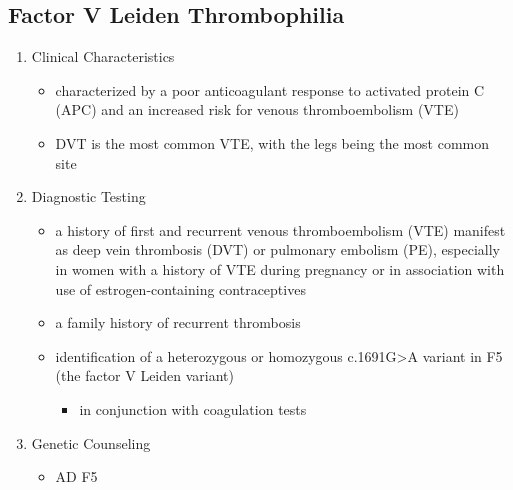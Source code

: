 \documentclass[12pt]{scrartcl}
\begin{document}
\subsection{Factor V Leiden Thrombophilia}
\label{sec:org8611655}
\begin{enumerate}
\item Clinical Characteristics
\label{sec:org2b34f58}
\begin{itemize}
\item characterized by a poor anticoagulant response to activated protein
C (APC) and an increased risk for venous thromboembolism (VTE)
\item DVT is the most common VTE, with the legs being the most common
site
\end{itemize}
\item Diagnostic Testing
\label{sec:org7561109}
\begin{itemize}
\item a history of first and recurrent venous thromboembolism (VTE)
manifest as deep vein thrombosis (DVT) or pulmonary embolism (PE),
especially in women with a history of VTE during pregnancy or in
association with use of estrogen-containing contraceptives
\item a family history of recurrent thrombosis

\item identification of a heterozygous or homozygous c.1691G>A variant in F5
(the factor V Leiden variant)
\begin{itemize}
\item in conjunction with coagulation tests
\end{itemize}
\end{itemize}
\item Genetic Counseling
\label{sec:org61e8cd1}
\begin{itemize}
\item AD F5
\end{itemize}
\end{enumerate}
\end{document}
